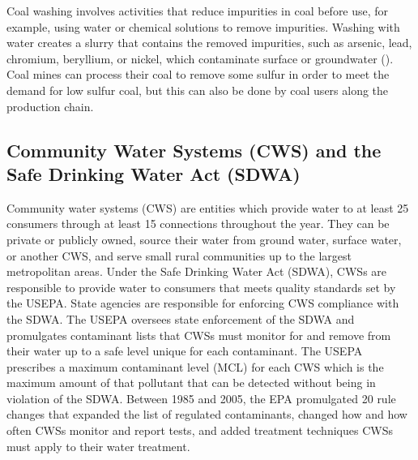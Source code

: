 \documentclass{article}
\begin{document}
Coal washing involves activities that reduce impurities in coal before use, for example, using water or chemical solutions to remove impurities. Washing with water creates a slurry that contains the removed impurities, such as arsenic, lead, chromium, beryllium, or nickel, which contaminate surface or groundwater (\cite{duhigg2009clean}). Coal mines can process their coal to remove some sulfur in order to meet the demand for low sulfur coal, but this can also be done by coal users along the production chain.

\subsection{Community Water Systems (CWS) and the Safe Drinking Water Act (SDWA)}

Community water systems (CWS) are entities which provide water to at least 25 consumers through at least 15 connections throughout the year. They can be private or publicly owned, source their water from ground water, surface water, or another CWS, and serve small rural communities up to the largest metropolitan areas. Under the Safe Drinking Water Act (SDWA), CWSs are responsible to provide water to consumers that meets quality standards set by the USEPA. State agencies are responsible for enforcing CWS compliance with the SDWA. The USEPA oversees state enforcement of the SDWA and promulgates contaminant lists that CWSs must monitor for and remove from their water up to a safe level unique for each contaminant. The USEPA prescribes a maximum contaminant level (MCL) for each CWS which is the maximum amount of that pollutant that can be detected without being in violation of the SDWA. Between 1985 and 2005, the EPA promulgated 20 rule changes that expanded the list of regulated contaminants, changed how and how often CWSs monitor and report tests, and added treatment techniques CWSs must apply to their water treatment.  
\end{document}
